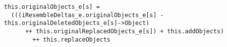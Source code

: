 \lstset{frame=tb, aboveskip=12pt, belowskip=-3pt, breaklines=true, basicstyle=\small\ttfamily, tabsize=2, mathescape=true}
\begin{lstlisting}[caption={base\_deltas.als, lines 125-128}, label=alloy:originalobjects_e, captionpos=b]
this.originalObjects_e[s] = 
  (((iResembleDeltas_e.originalObjects_e[s] - this.originalDeletedObjects_e[s]->Object)
      ++ this.originalReplacedObjects_e[s]) + this.addObjects)
        ++ this.replaceObjects  
\end{lstlisting}

